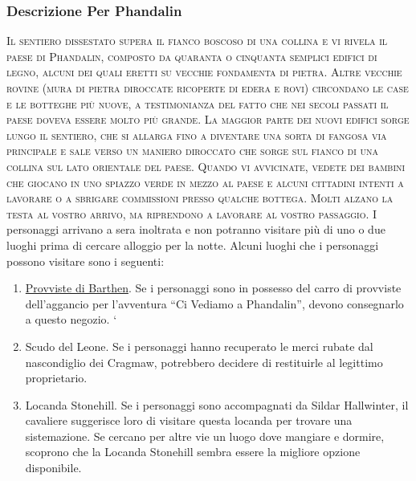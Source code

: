 \documentclass{article}
\begin{document}
        \subsubsection{Descrizione Per Phandalin}
        \textsc{Il sentiero dissestato supera il fianco boscoso di una collina
        e vi rivela il paese di Phandalin, composto da quaranta o
        cinquanta semplici edifici di legno, alcuni dei quali eretti su
        vecchie fondamenta di pietra. Altre vecchie rovine (mura di
        pietra diroccate ricoperte di edera e rovi) circondano le case e
        le botteghe più nuove, a testimonianza del fatto che nei secoli
        passati il paese doveva essere molto più grande. La maggior
        parte dei nuovi edifici sorge lungo il sentiero, che si allarga
        fino a diventare una sorta di fangosa via principale e sale verso
        un maniero diroccato che sorge sul fianco di una collina sul
        lato orientale del paese.
        Quando vi avvicinate, vedete dei bambini che giocano in
        uno spiazzo verde in mezzo al paese e alcuni cittadini intenti
        a lavorare o a sbrigare commissioni presso qualche bottega.
        Molti alzano la testa al vostro arrivo, ma riprendono a lavorare
        al vostro passaggio.} 
I personaggi
arrivano a sera inoltrata e non potranno visitare più di uno o 
due luoghi prima di cercare alloggio per la notte.\newline
Alcuni luoghi che i personaggi possono visitare sono
i seguenti:
\begin{enumerate}
    \item \hyperlink{provviste}{Provviste di Barthen}. Se i personaggi sono in possesso del
carro di provviste dell’aggancio per l'avventura “Ci Vediamo
a Phandalin”, devono consegnarlo a questo negozio.
`\item Scudo del Leone. Se i personaggi hanno recuperato le
merci rubate dal nascondiglio dei Cragmaw, potrebbero
decidere di restituirle al legittimo proprietario.
\item Locanda Stonehill. Se i personaggi sono accompagnati
da Sildar Hallwinter, il cavaliere suggerisce loro di visitare
questa locanda per trovare una sistemazione. Se cercano
per altre vie un luogo dove mangiare e dormire, scoprono
che la Locanda Stonehill sembra essere la migliore opzione
disponibile.
\end{enumerate}
\end{document}
